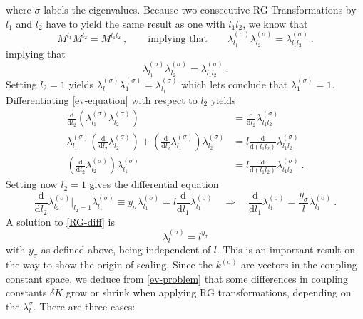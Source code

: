 	where $\sigma$ labels the eigenvalues. Because two consecutive RG Transformations by $l_1$ and $l_2$ have to yield the same result as one  with $l_1l_2$, we know that 
	\begin{equation}
		M^{l_1}M^{l_2} =	M^{l_1l_2}~, \qquad \text{implying that} \qquad \lambda_{l_1}^{(\sigma)} \lambda_{l_2}^{(\sigma)} =	\lambda_{l_1l_2}^{(\sigma)} ~.
	\end{equation}
	implying that
	\begin{equation}
		\lambda_{l_1}^{(\sigma)} \lambda_{l_2}^{(\sigma)} =	\lambda_{l_1l_2}^{(\sigma)} ~.
		\label{ev-equation}
	\end{equation}
	Setting $l_2 = 1$ yields $\lambda_{l_1}^{(\sigma)} \lambda_{1}^{(\sigma)} =	\lambda_{l_1}^{(\sigma)}$ which lets conclude that $\lambda_{1}^{(\sigma)} =	1$. Differentiating \autoref{ev-equation} with respect to $l_2$ yields
	\begin{equation}
			\begin{split}
			\frac{\text{d}}{\text{d}l_2} \left(\lambda_{l_1}^{(\sigma)} \lambda_{l_2}^{(\sigma)}\right) &= 	\frac{\text{d}}{\text{d}l_2} \lambda_{l_1l_2}^{(\sigma)} \\
			\lambda_{l_1}^{(\sigma)}  \left(\frac{\text{d}}{\text{d}l_2} \lambda_{l_2}^{(\sigma)}\right) +  			  \left( \frac{\text{d}}{\text{d}l_2} \lambda_{l_1}^{(\sigma)}\right) \lambda_{l_2}^{(\sigma)} &= l \frac{\text{d}}{\text{d}(l_1l_2)} \lambda_{l_1l_2}^{(\sigma)} \\
				\left(\frac{\text{d}}{\text{d}l_2} \lambda_{l_2}^{(\sigma)}\right) \lambda_{l_1}^{(\sigma)}   &= l \frac{\text{d}}{\text{d}(l_1l_2)} \lambda_{l_1l_2}^{(\sigma)}	~.
		\end{split}
	\end{equation}
	Setting now $l_2 =	1$ gives the differential equation
	\begin{equation}\label{RG-diff}
		\frac{\text{d}}{\text{d}l_2} \lambda_{l_2}^{(\sigma)} \bigg |_{l_2 =	1} \lambda_{l_1}^{(\sigma)}   \equiv y_\sigma \lambda_{l_1}^{(\sigma)} = l \frac{\text{d}}{\text{d}l_1} \lambda_{l_1}^{(\sigma)} \quad \Rightarrow \quad \frac{\text{d}}{\text{d}l_1} \lambda_{l_1}^{(\sigma)} =	\frac{y_\sigma}{l} \lambda_{l_1}^{(\sigma)} ~.		
	\end{equation}
	A solution to \autoref{RG-diff} is
	\begin{equation} \label{ev-form}
		\lambda_l^{(\sigma)} = l^{y_\sigma}	
	\end{equation}
	with $y_\sigma$ as defined above, being independent of $l$. This is an important result on the way to show the origin of scaling. Since the $k^{(\sigma)}$ are vectors in the coupling constant space, we deduce from \autoref{ev-problem} that some differences in coupling constants $\delta K$ grow or shrink when applying RG transformations, depending on the $\lambda_l^{\sigma}$. There are three cases:
